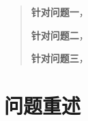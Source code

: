 \maketitle%

\begin{abstract}%


	
	
	
	\textbf{针对问题一}，	%
	
	
	
	
	\textbf{针对问题二}，%
	
	
	
	\textbf{针对问题三}，%
	
	
	
	
	
	
	
	
	
\end{abstract}
\section{问题重述}
